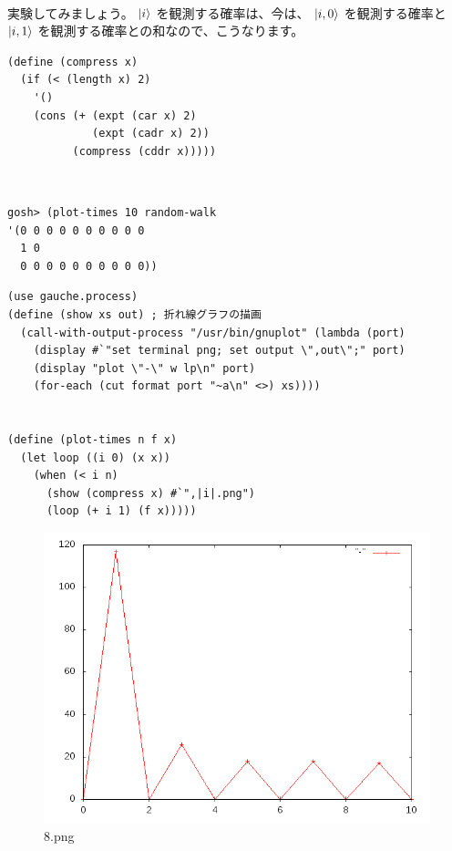 \hline
\begin{minipage}{.01\hsize}
  ~
\end{minipage}
\begin{minipage}{.39\hsize}
  実験してみましょう。
  $| i \rangle$ を観測する確率は、今は、
  $| i,0 \rangle$ を観測する確率と
  $| i,1 \rangle$ を観測する確率との和なので、こうなります。
\begin{verbatim}
(define (compress x)
  (if (< (length x) 2)
    '()
    (cons (+ (expt (car x) 2)
             (expt (cadr x) 2))
          (compress (cddr x)))))
\end{verbatim}
\end{minipage}
\begin{minipage}{.10\hsize}
  ~
\end{minipage}
\begin{minipage}{.39\hsize}
\begin{verbatim}
gosh> (plot-times 10 random-walk
'(0 0 0 0 0 0 0 0 0 0
  1 0
  0 0 0 0 0 0 0 0 0 0))
\end{verbatim}
\end{minipage}

\hline

  \begin{verbatim}
(use gauche.process)
(define (show xs out) ; 折れ線グラフの描画
  (call-with-output-process "/usr/bin/gnuplot" (lambda (port)
    (display #`"set terminal png; set output \",out\";" port)
    (display "plot \"-\" w lp\n" port)
    (for-each (cut format port "~a\n" <>) xs))))


(define (plot-times n f x)
  (let loop ((i 0) (x x))
    (when (< i n)
      (show (compress x) #`",|i|.png")
      (loop (+ i 1) (f x)))))
\end{verbatim}

\begin{figure}[h!]
  \begin{center}
\includegraphics[width=1.0\textwidth,bb=0 0 640 480]{img/8.png}
\caption{8.png}
  \end{center}
\end{figure}


